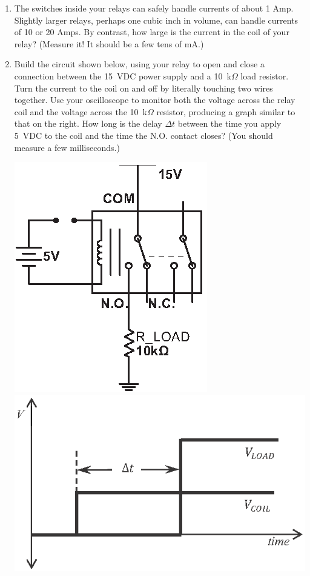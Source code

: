 \begin{enumerate}[wide]
\item The switches inside your relays can safely handle currents of about 1 Amp.  Slightly larger relays, perhaps one cubic inch in volume, can handle currents of 10 or 20 Amps.  By contrast, how large is the current in the coil of your relay?  (Measure it!  It should be a few tens of mA.)


\item Build the circuit shown below, using your relay to open and close a connection between the 15~VDC power supply and a 10~k$\Omega$ load resistor.  
Turn the current to the coil on and off by literally touching two wires together.  
Use your oscilloscope to monitor both the voltage across the relay coil and the voltage across the 10~k$\Omega$ resistor, producing a graph similar to that on the right.  
How long is the delay $\Delta t$ between the time you apply 5~VDC to the coil and the time the N.O. contact closes?
(You should measure a few milliseconds.)

\begin{center}
\includegraphics{relays/relay_timing_circuit.eps}
\hspace{0.6in}
\includegraphics{relays/v_vs_t_graph.eps}
\end{center}


\end{enumerate}

